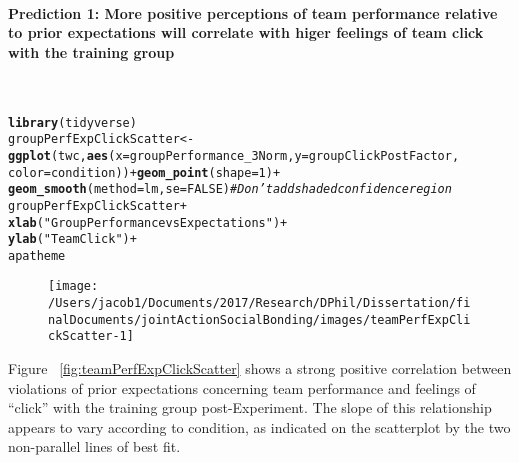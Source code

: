 \documentclass[english]{article}\usepackage[]{graphicx}\usepackage[]{color}
\makeatletter
\def\maxwidth{ %
  \ifdim\Gin@nat@width>\linewidth
    \linewidth
  \else
    \Gin@nat@width
  \fi
}
\newcommand{\hlnum}[1]{\textcolor[rgb]{0.686,0.059,0.569}{#1}}%
\newcommand{\hlstr}[1]{\textcolor[rgb]{0.192,0.494,0.8}{#1}}%
\newcommand{\hlcom}[1]{\textcolor[rgb]{0.678,0.584,0.686}{\textit{#1}}}%
\newcommand{\hlopt}[1]{\textcolor[rgb]{0,0,0}{#1}}%
\newcommand{\hlstd}[1]{\textcolor[rgb]{0.345,0.345,0.345}{#1}}%
\newcommand{\hlkwb}[1]{\textcolor[rgb]{0.69,0.353,0.396}{#1}}%
\newcommand{\hlkwc}[1]{\textcolor[rgb]{0.333,0.667,0.333}{#1}}%
\newcommand{\hlkwd}[1]{\textcolor[rgb]{0.737,0.353,0.396}{\textbf{#1}}}%
\newenvironment{kframe}{%
 \def\at@end@of@kframe{}%
 \ifinner\ifhmode%
  \def\at@end@of@kframe{\end{minipage}}%
  \begin{minipage}{\columnwidth}%
 \fi\fi%
 \def\FrameCommand##1{\hskip\@totalleftmargin \hskip-\fboxsep
 \colorbox{shadecolor}{##1}\hskip-\fboxsep
     \hskip-\linewidth \hskip-\@totalleftmargin \hskip\columnwidth}%
 \MakeFramed {\advance\hsize-\width
   \@totalleftmargin\z@ \linewidth\hsize
   \@setminipage}}%
 {\par\unskip\endMakeFramed%
 \at@end@of@kframe}
\newenvironment{knitrout}{}{} %
\newcommand{\myparagraph}[1]{\paragraph{#1}\mbox{}\\}
\makeatother
\begin{document}
\myparagraph{Prediction 1: More positive perceptions of team performance relative to prior expectations will correlate with higer feelings of team click with the training group}

\begin{knitrout}
\color{fgcolor}\begin{kframe}
\begin{alltt}
\hlkwd{library}\hlstd{(tidyverse)}
  \hlstd{groupPerfExpClickScatter} \hlkwb{<-} \hlkwd{ggplot}\hlstd{(twc,} \hlkwd{aes}\hlstd{(}\hlkwc{x}\hlstd{=groupPerformance_3Norm,} \hlkwc{y}\hlstd{=groupClickPostFactor,}
                              \hlkwc{color}\hlstd{=condition))} \hlopt{+} \hlkwd{geom_point}\hlstd{(}\hlkwc{shape} \hlstd{=} \hlnum{1}\hlstd{)} \hlopt{+}
                              \hlkwd{geom_smooth}\hlstd{(}\hlkwc{method}\hlstd{=lm,} \hlkwc{se}\hlstd{=}\hlnum{FALSE}\hlstd{)}   \hlcom{# Don't add shaded confidence region}
  \hlstd{groupPerfExpClickScatter} \hlopt{+}
              \hlkwd{xlab}\hlstd{(}\hlstr{"Group Performance vs Expectations"}\hlstd{)} \hlopt{+}
              \hlkwd{ylab}\hlstd{(}\hlstr{"Team Click"}\hlstd{)} \hlopt{+}
              \hlstd{apatheme}
\end{alltt}


{\ttfamily\noindent\color{warningcolor}{\#\# Warning: Removed 1 rows containing non-finite values (stat\_smooth).}}

{\ttfamily\noindent\color{warningcolor}{\#\# Warning: Removed 1 rows containing missing values (geom\_point).}}\end{kframe}\begin{figure}

{\centering \texttt{[image: /Users/jacob1/Documents/2017/Research/DPhil/Dissertation/finalDocuments/jointActionSocialBonding/images/teamPerfExpClickScatter-1]} 

}

\end{figure}


\end{knitrout}



Figure ~\ref{fig:teamPerfExpClickScatter} shows a strong positive correlation between violations of prior expectations concerning team performance and feelings of ``click'' with the training group post-Experiment.  The slope of this relationship appears to vary according to condition, as indicated on the scatterplot by the two non-parallel lines of best fit.
\end{document}
